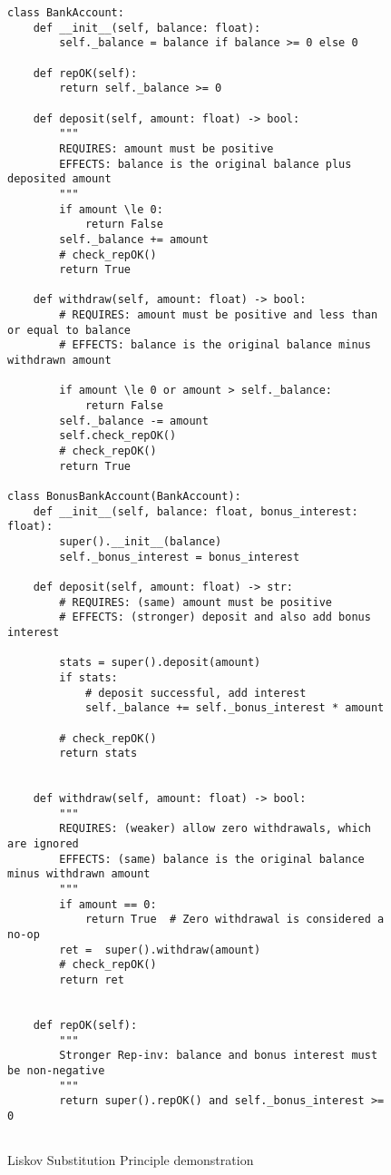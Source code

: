 \documentclass[oneside,11pt,dvipsnames]{book}
\begin{document}

\begin{figure}
    \begin{lstlisting}
class BankAccount:
    def __init__(self, balance: float):
        self._balance = balance if balance >= 0 else 0  
        
    def repOK(self):
        return self._balance >= 0

    def deposit(self, amount: float) -> bool:
        """
        REQUIRES: amount must be positive
        EFFECTS: balance is the original balance plus deposited amount
        """
        if amount \le 0:
            return False
        self._balance += amount
        # check_repOK()
        return True

    def withdraw(self, amount: float) -> bool:
        # REQUIRES: amount must be positive and less than or equal to balance
        # EFFECTS: balance is the original balance minus withdrawn amount

        if amount \le 0 or amount > self._balance:
            return False
        self._balance -= amount
        self.check_repOK()
        # check_repOK()
        return True

class BonusBankAccount(BankAccount):
    def __init__(self, balance: float, bonus_interest: float):
        super().__init__(balance)
        self._bonus_interest = bonus_interest

    def deposit(self, amount: float) -> str:
        # REQUIRES: (same) amount must be positive
        # EFFECTS: (stronger) deposit and also add bonus interest

        stats = super().deposit(amount)
        if stats:
            # deposit successful, add interest
            self._balance += self._bonus_interest * amount
        
        # check_repOK()
        return stats


    def withdraw(self, amount: float) -> bool:
        """
        REQUIRES: (weaker) allow zero withdrawals, which are ignored
        EFFECTS: (same) balance is the original balance minus withdrawn amount
        """
        if amount == 0:
            return True  # Zero withdrawal is considered a no-op
        ret =  super().withdraw(amount)
        # check_repOK()
        return ret
    
    
    def repOK(self):
        """
        Stronger Rep-inv: balance and bonus interest must be non-negative
        """
        return super().repOK() and self._bonus_interest >= 0
        
    \end{lstlisting}
\caption{Liskov Substitution Principle demonstration}\label{ex:bankaccount}
\end{figure}
\end{document}
